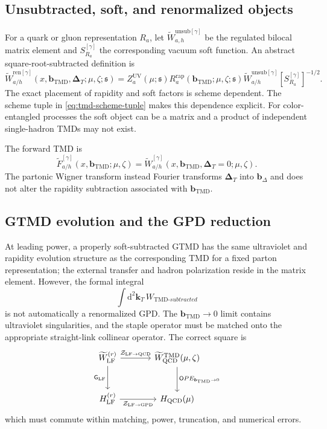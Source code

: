 \documentclass[11pt]{article}
\newcommand{\kT}{\bm{k}_{T}}
\newcommand{\DT}{\bm{\Delta}_{T}}
\newcommand{\bD}{\bm{b}_{\Delta}}
\newcommand{\bM}{\bm{b}_{\mathrm{TMD}}}
\newcommand{\dd}{\mathrm{d}}
\newcommand{\LF}{\mathrm{LF}}
\newcommand{\TMD}{\mathrm{TMD}}
\newcommand{\QCD}{\mathrm{QCD}}
\newcommand{\GPD}{\mathrm{GPD}}
\newcommand{\cZ}{\mathcal Z}
\newcommand{\ren}{\mathrm{ren}}
\newcommand{\unsub}{\mathrm{unsub}}
\newcommand{\rap}{\mathrm{rap}}
\newcommand{\UV}{\mathrm{UV}}
\begin{document}
\subsection{Unsubtracted, soft, and renormalized objects}

For a quark or gluon representation \(R_a\), let
\(\widetilde W_{a,h}^{\unsub[\gamma]}\) be the regulated bilocal matrix element
and \(S_{R_a}^{[\gamma]}\) the corresponding vacuum soft function.  An abstract
square-root-subtracted definition is
\begin{equation}
 \widetilde W_{a/h}^{\ren[\gamma]}
 (x,\bM,\DT;\mu,\zeta;\mathfrak s)
 =
 Z_{a}^{\UV}(\mu;\mathfrak s)
 R_a^{\rap}(\bM;\mu,\zeta;\mathfrak s)
 \widetilde W_{a/h}^{\unsub[\gamma]}
 \left[S_{R_a}^{[\gamma]}\right]^{-1/2}.
 \label{eq:renormalized-gtmd}
\end{equation}
The exact placement of rapidity and soft factors is scheme dependent.  The
scheme tuple in \cref{eq:tmd-scheme-tuple} makes this dependence explicit.
For color-entangled processes the soft object can be a matrix and a product of
independent single-hadron TMDs may not exist.

The forward TMD is
\begin{equation}
 \widetilde F_{a/h}^{[\gamma]}
 (x,\bM;\mu,\zeta)
 =
 \widetilde W_{a/h}^{[\gamma]}
 (x,\bM,\DT=0;\mu,\zeta).
 \label{eq:forward-tmd-from-gtmd}
\end{equation}
The partonic Wigner transform instead Fourier transforms \(\DT\) into
\(\bD\) and does not alter the rapidity subtraction associated with \(\bM\).

\subsection{GTMD evolution and the GPD reduction}

At leading power, a properly soft-subtracted GTMD has the same ultraviolet and
rapidity evolution structure as the corresponding TMD for a fixed parton
representation; the external transfer and hadron polarization reside in the
matrix element.  However, the formal integral
\begin{equation}
 \int\dd^2\kT\,W_{\TMD\text{-}subtracted}
 \label{eq:naive-gtmd-gpd-integral}
\end{equation}
is not automatically a renormalized GPD.  The \(\bM\to0\) limit contains
ultraviolet singularities, and the staple operator must be matched onto the
appropriate straight-link collinear operator.  The correct square is
\begin{equation}
\begin{tikzcd}[column sep=large,row sep=large]
 \widetilde W_{\LF}^{(r)}
 \arrow[r,"\cZ_{\LF\to\QCD}"]
 \arrow[d,"\mathsf G_{\LF}"']
 &
 \widetilde W_{\QCD}^{\TMD}(\mu,\zeta)
 \arrow[d,"\mathsf OPE_{\bM\to0}"]
 \\
 H_{\LF}^{(r)}
 \arrow[r,"\cZ_{\LF\to\GPD}"']
 &
 H_{\QCD}(\mu)
\end{tikzcd}
 \label{eq:matched-gtmd-gpd-square}
\end{equation}
which must commute within matching, power, truncation, and numerical errors.
\end{document}
